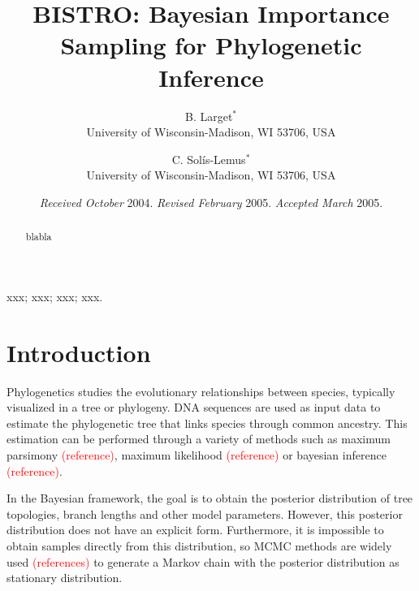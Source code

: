 \documentclass[useAMS,usenatbib]{biom}
\title[BISTRO]{BISTRO: Bayesian Importance Sampling for Phylogenetic Inference}
\author{B. Larget$^{*}$\email{bret.larget@wisc.edu} \\
	   University of Wisconsin-Madison, WI 53706, USA
	   \and
	   C. Sol\'{i}s-Lemus$^{*}$\email{solislemus@wisc.edu}\\
	   University of Wisconsin-Madison, WI 53706, USA
	   }
\newcommand{\falta}[1]{\textcolor{red}{#1}}
\begin{document}
\date{{\it Received October} 2004. {\it Revised February} 2005.\newline
{\it Accepted March} 2005.}

\pagerange{\pageref{firstpage}--\pageref{lastpage}} 



\label{firstpage}


\begin{abstract}
blabla
\end{abstract}

%
%

\begin{keywords}
xxx; xxx; xxx; xxx.
\end{keywords}

\maketitle

\section{Introduction}
\label{s:intro}

Phylogenetics studies the evolutionary relationships between species,
typically visualized in a tree or phylogeny. DNA sequences are used as
input data to estimate the phylogenetic tree that links species
through common ancestry. This estimation can be performed through a
variety of methods such as maximum parsimony \falta{(reference)},
maximum likelihood \falta{(reference)} or bayesian inference
\falta{(reference)}.

In the Bayesian framework, the goal is to obtain the posterior
distribution of tree topologies, branch lengths and other model
parameters. However, this posterior distribution does not have an
explicit form. Furthermore, it is impossible to obtain samples
directly from this distribution, so MCMC methods are widely used
\falta{(references)} to generate a Markov chain with the posterior
distribution as stationary distribution.
\end{document}
